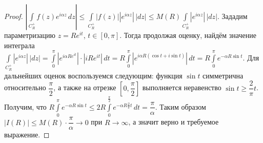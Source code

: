 \begin{proof}
\(|\int\limits_{C_R^+} f(z) e^{i \alpha z} \, dz| \le \int\limits_{C_R^+} |f(z)| |e^{i \alpha z}| 
\, |dz| \le M(R) \int\limits_{C_R^+} |e^{i \alpha z}| \, |dz|\). Зададим параметризацию
\(z = Re^{it}\), \(t \in [0, \pi]\). Тогда продолжая оценку, найдём значение интеграла
\(\int\limits_{C_R^+}|e^{i \alpha z}| \, |dz| = \int\limits_0^\pi |e^{i \alpha R e^{it}}| \cdot 
|iRe^{it}| \, dt = R\int\limits_0^\pi |e^{i \alpha R (\cos{t} + i \sin{t})}| \, dt = R
\int\limits_0^\pi e^{- \alpha R \sin{t}}\). Для дальнейших оценок воспользуемся следующим: функция
\(\sin{t}\) симметрична относительно \(\dfrac{\pi}{2}\), а также на отрезке \([0, \dfrac{\pi}{2}]\)
выполняется неравенство \(\sin{t} \ge \dfrac{2}{\pi}t\). Получим, что \(R \int\limits_0^\pi 
e^{- \alpha R \sin{t}} \le 2R \int\limits_0^{\frac{\pi}{2}}e^{-\alpha R \frac{2}{\pi} t} \, dt = 
\dfrac{\pi}{\alpha}\). Таким образом \(|I(R)| \le M(R) \cdot \dfrac{\pi}{\alpha} \to 0\) при 
\(R \to \infty\), а значит верно и требуемое выражение.
\end{proof}

